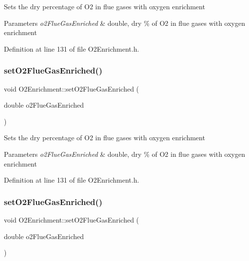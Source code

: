 Sets the dry percentage of O2 in flue gases with oxygen enrichment 
\begin{DoxyParams}{Parameters}
{\em o2\+Flue\+Gas\+Enriched} & double, dry \% of O2 in flue gases with oxygen enrichment \\
\hline
\end{DoxyParams}


Definition at line 131 of file O2\+Enrichment.\+h.

\mbox{\label{class_o2_enrichment_a9866f25fe54e561579079ee1a3889c2d}} 
\subsubsection{\texorpdfstring{set\+O2\+Flue\+Gas\+Enriched()}{setO2FlueGasEnriched()}\hspace{0.1cm}{\footnotesize\ttfamily [2/3]}}
{\footnotesize\ttfamily void O2\+Enrichment\+::set\+O2\+Flue\+Gas\+Enriched (\begin{DoxyParamCaption}\item[{double}]{o2\+Flue\+Gas\+Enriched }\end{DoxyParamCaption})\hspace{0.3cm}{\ttfamily [inline]}}

Sets the dry percentage of O2 in flue gases with oxygen enrichment 
\begin{DoxyParams}{Parameters}
{\em o2\+Flue\+Gas\+Enriched} & double, dry \% of O2 in flue gases with oxygen enrichment \\
\hline
\end{DoxyParams}


Definition at line 131 of file O2\+Enrichment.\+h.

\mbox{\label{class_o2_enrichment_a9866f25fe54e561579079ee1a3889c2d}} 
\subsubsection{\texorpdfstring{set\+O2\+Flue\+Gas\+Enriched()}{setO2FlueGasEnriched()}\hspace{0.1cm}{\footnotesize\ttfamily [3/3]}}
{\footnotesize\ttfamily void O2\+Enrichment\+::set\+O2\+Flue\+Gas\+Enriched (\begin{DoxyParamCaption}\item[{double}]{o2\+Flue\+Gas\+Enriched }\end{DoxyParamCaption})\hspace{0.3cm}{\ttfamily [inline]}}


